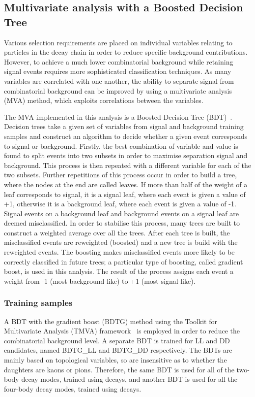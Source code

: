 \subsection{Multivariate analysis with a Boosted Decision Tree}
\label{sec:selection:bdt}

Various selection requirements are placed on individual variables relating to particles in the decay chain in order to reduce specific background contributions. However, to achieve a much lower combinatorial background while retaining signal events requires more sophisticated classification techniques. As many variables are correlated with one another, the ability to separate signal from combinatorial background can be improved by using a multivariate analysis (MVA) method, which exploits correlations between the variables. 

The MVA implemented in this analysis is a Boosted Decision Tree (BDT)~\cite{Breiman}. Decision trees take a given set of variables from signal and background training samples and construct an algorithm to decide whether a given event corresponds to signal or background. Firstly, the best combination of variable and value is found to split events into two subsets in order to maximise separation signal and background. This process is then repeated with a different variable for each of the two subsets. Further repetitions of this process occur in order to build a tree, where the nodes at the end are called leaves. If more than half of the weight of a leaf corresponds to signal, it is a signal leaf, where each event is given a value of +1, otherwise it is a background leaf, where each event is given a value of -1. Signal events on a background leaf and background events on a signal leaf are deemed misclassified. In order to stabilise this process, many trees are built to construct a weighted average over all the trees. After each tree is built, the misclassified events are reweighted (boosted) and a new tree is build with the reweighted events. The boosting makes misclassified events more likely to be correctly classified in future trees; a particular type of boosting, called gradient boost, is used in this analysis. The result of the process assigns each event a weight from -1 (most background-like) to +1 (most signal-like). 

\subsubsection{Training samples}

A BDT with the gradient boost (BDTG) method using the Toolkit for Multivariate Analysis (TMVA) framework~\cite{TMVA} is employed in order to reduce the combinatorial background level. A separate BDT is trained for LL and DD candidates, named BDTG\_LL and BDTG\_DD respectively. The BDTs are mainly based on topological variables, so are insensitive as to whether the \Dz daughters are kaons or pions. Therefore, the same BDT is used for all of the two-body \Dz decay modes, trained using \kpi decays, and another BDT is used for all the four-body \Dz decay modes, trained using \kpipipi decays. 

